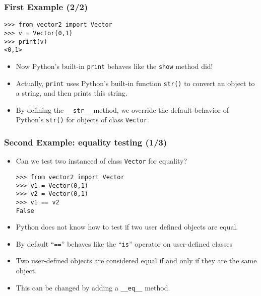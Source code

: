 \begin{frame}[fragile]\frametitle{First Example (2/2)}
\begin{lstlisting}
>>> from vector2 import Vector
>>> v = Vector(0,1)
>>> print(v)
<0,1>
\end{lstlisting}
\begin{itemize}
\item Now Python's built-in \texttt{print} behaves like the \texttt{show} method did!
\item Actually, \texttt{print} uses Python's built-in function
  \texttt{str()} to convert an object to a string, and then prints
  this string.
\item By defining the \texttt{\_\_str\_\_} method, we
    override the default behavior of Python's \texttt{str()} for
    objects of class \texttt{Vector}.
\end{itemize}
\end{frame}

\begin{frame}[fragile]\frametitle{Second Example: equality testing (1/3)}

\begin{itemize}
\item  Can we test two instanced of class \texttt{Vector} for equality?
\begin{lstlisting}
>>> from vector2 import Vector
>>> v1 = Vector(0,1)
>>> v2 = Vector(0,1)
>>> v1 == v2
False
\end{lstlisting}

\item  Python does not know how to test if two user defined objects are  equal.

\item  By default ``\texttt{==}'' behaves like the ``\texttt{is}'' operator on user-defined classes
\item Two
  user-defined objects are considered equal if and only if they are
  the same object.

\item  This can be changed by adding a \texttt{\_\_eq\_\_} method.
\end{itemize}
\end{frame}

